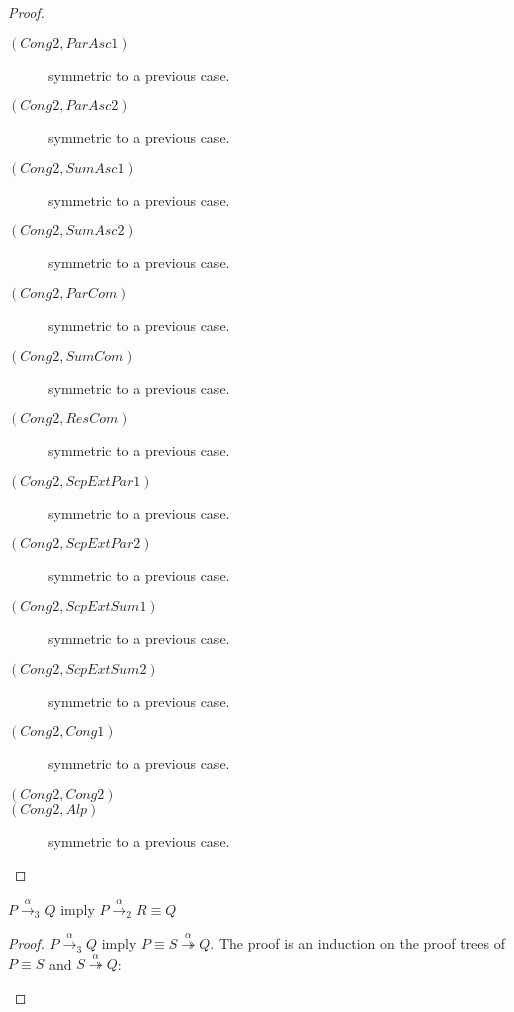\begin{lemma}
\begin{proof}
\begin{description}
      \item[$(Cong2, ParAsc1)$] symmetric to a previous case.
      \item[$(Cong2, ParAsc2)$] symmetric to a previous case.
      \item[$(Cong2, SumAsc1)$] symmetric to a previous case.
      \item[$(Cong2, SumAsc2)$] symmetric to a previous case.
      \item[$(Cong2, ParCom)$] symmetric to a previous case.
      \item[$(Cong2, SumCom)$] symmetric to a previous case.
      \item[$(Cong2, ResCom)$] symmetric to a previous case.
      \item[$(Cong2, ScpExtPar1)$] symmetric to a previous case.
      \item[$(Cong2, ScpExtPar2)$] symmetric to a previous case.
      \item[$(Cong2, ScpExtSum1)$] symmetric to a previous case.
      \item[$(Cong2, ScpExtSum2)$] symmetric to a previous case.
      \item[$(Cong2, Cong1)$] symmetric to a previous case.
      \item[$(Cong2, Cong2)$] 
      \item[$(Cong2, Alp)$] symmetric to a previous case.

    \end{description}
  \end{proof}
\end{lemma}


\begin{theorem}
  $P \xrightarrow{\alpha}_{3} Q$ imply $P \xrightarrow{\alpha}_{2} R\equiv Q$
  \begin{proof}
    $P \xrightarrow{\alpha}_{3} Q$ imply $P\equiv S \stackrel{\alpha}{\twoheadrightarrow} Q$. The proof is an induction on the proof trees of $P\equiv S$ and $S \stackrel{\alpha}{\twoheadrightarrow} Q$:
    \begin{description}
      \item[]
    \end{description}
  \end{proof}
\end{theorem}
